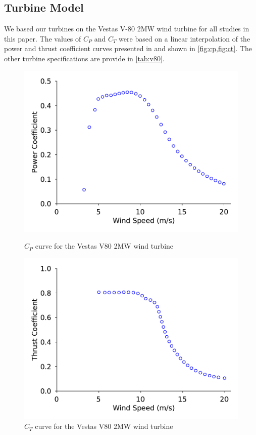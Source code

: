 \documentclass[a4paper]{jpconf}
\begin{document}
\subsection{Turbine Model}
We based our turbines on the Vestas V-80 2MW wind turbine for all studies in this paper. The values of $C_P$ and $C_T$ were based on a linear interpolation of the power and thrust coefficient curves presented in \cite{niayifar2016} and shown in \cref{fig:cp,fig:ct}. The other turbine specifications are provide in \cref{tab:v80}.
%
\begin{figure}[ht]
	\centering
	\begin{minipage}[t]{0.48\textwidth}
		\centering
		\includegraphics[width=\textwidth, trim={0cm 0cm 0cm 0cm}, clip]{cp_curve_v80}
		\caption{$C_P$ curve for the Vestas V80 2MW wind turbine \cite{niayifar2016} }
		\label{fig:cp}
	\end{minipage}\hspace{1pc}%
	\begin{minipage}[t]{0.48\textwidth}
		\centering
		\includegraphics[width=\textwidth]{ct_curve_v80.pdf}
		\caption{$C_T$ curve for the Vestas V80 2MW wind turbine \cite{niayifar2016}}
		\label{fig:ct}
	\end{minipage} 
\end{figure}
\end{document}
